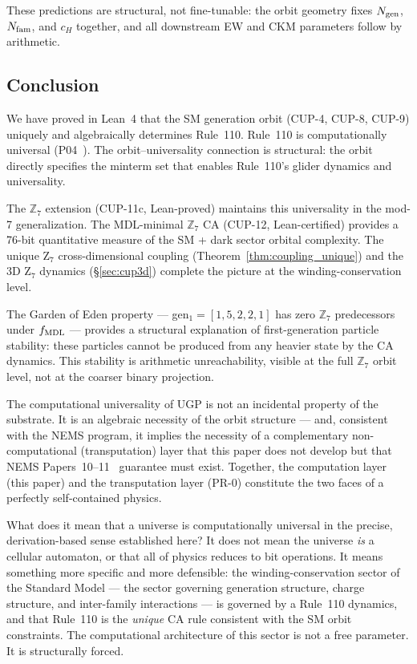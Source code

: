 \documentclass[11pt]{article}
\theoremstyle{remark}
\begin{document}
\noindent These predictions are structural, not fine-tunable: the orbit geometry fixes
$N_{\rm gen}$, $N_{\rm fam}$, and $c_H$ together, and all downstream EW and CKM
parameters follow by arithmetic.

\subsection{Conclusion}

We have proved in Lean~4 that the SM generation orbit (CUP-4, CUP-8, CUP-9) uniquely
and algebraically determines Rule~110. Rule~110 is computationally universal (P04~\cite{Spivack2025_UGPDynamicsUniversality}).
The orbit--universality connection is structural: the orbit directly specifies the
minterm set that enables Rule~110's glider dynamics and universality.

The $\mathbb{Z}_7$ extension (CUP-11c, Lean-proved) maintains this universality
in the mod-7 generalization. The MDL-minimal $\mathbb{Z}_7$ CA (CUP-12, Lean-certified)
provides a 76-bit quantitative measure of the SM + dark sector orbital complexity.
The unique Z$_7$ cross-dimensional coupling (Theorem~\ref{thm:coupling_unique}) and
the 3D Z$_7$ dynamics (\S\ref{sec:cup3d}) complete the picture at the winding-conservation
level.

The Garden of Eden property --- gen$_1 = [1,5,2,2,1]$ has zero $\mathbb{Z}_7$
predecessors under $f_{\rm MDL}$ --- provides a structural explanation of first-generation
particle stability: these particles cannot be produced from any heavier state by the CA
dynamics. This stability is arithmetic unreachability, visible at the full $\mathbb{Z}_7$
orbit level, not at the coarser binary projection.

The computational universality of UGP is not an incidental property of the substrate.
It is an algebraic necessity of the orbit structure --- and, consistent with the NEMS
program, it implies the necessity of a complementary non-computational (transputation)
layer that this paper does not develop but that NEMS Papers~10--11~\cite{SpivackUGP2024} guarantee must exist.
Together, the computation layer (this paper) and the transputation layer (PR-0)
constitute the two faces of a perfectly self-contained physics.

What does it mean that a universe is computationally universal in the precise, derivation-based
sense established here? It does not mean the universe \emph{is} a cellular automaton, or
that all of physics reduces to bit operations. It means something more specific and more
defensible: the winding-conservation sector of the Standard Model --- the sector governing
generation structure, charge structure, and inter-family interactions --- is governed by
a Rule~110 dynamics, and that Rule~110 is the \emph{unique} CA rule consistent with the
SM orbit constraints. The computational architecture of this sector is not a free parameter.
It is structurally forced.
\end{document}

